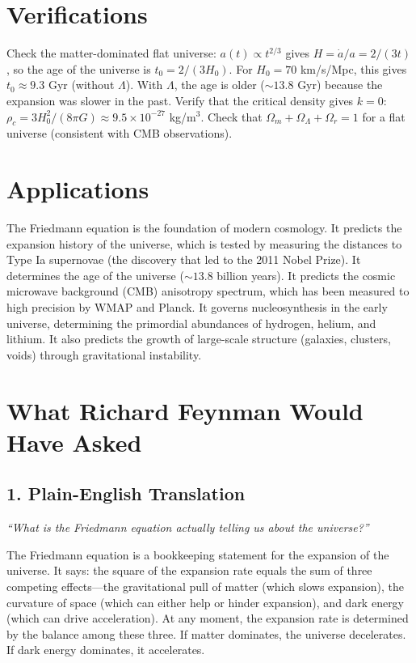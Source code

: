 \section*{Verifications}

Check the matter-dominated flat universe: $a(t) \propto t^{2/3}$ gives $H = \dot{a}/a = 2/(3t)$, so the age of the universe is $t_0 = 2/(3H_0)$. For $H_0 = 70$ km/s/Mpc, this gives $t_0 \approx 9.3$ Gyr (without $\Lambda$). With $\Lambda$, the age is older ($\sim 13.8$ Gyr) because the expansion was slower in the past. Verify that the critical density gives $k = 0$: $\rho_c = 3H_0^2/(8\pi G) \approx 9.5 \times 10^{-27}$ kg/m$^3$. Check that $\Omega_m + \Omega_\Lambda + \Omega_r = 1$ for a flat universe (consistent with CMB observations).
\section*{Applications}

The Friedmann equation is the foundation of modern cosmology. It predicts the expansion history of the universe, which is tested by measuring the distances to Type Ia supernovae (the discovery that led to the 2011 Nobel Prize). It determines the age of the universe ($\sim 13.8$ billion years). It predicts the cosmic microwave background (CMB) anisotropy spectrum, which has been measured to high precision by WMAP and Planck. It governs nucleosynthesis in the early universe, determining the primordial abundances of hydrogen, helium, and lithium. It also predicts the growth of large-scale structure (galaxies, clusters, voids) through gravitational instability.
\section*{What Richard Feynman Would Have Asked}

\subsection*{1. Plain-English Translation}
\textit{``What is the Friedmann equation actually telling us about the universe?''}

The Friedmann equation is a bookkeeping statement for the expansion of the universe. It says: the square of the expansion rate equals the sum of three competing effects---the gravitational pull of matter (which slows expansion), the curvature of space (which can either help or hinder expansion), and dark energy (which can drive acceleration). At any moment, the expansion rate is determined by the balance among these three. If matter dominates, the universe decelerates. If dark energy dominates, it accelerates.

